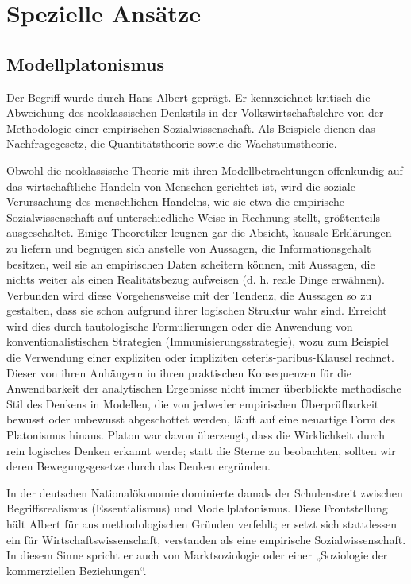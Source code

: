 \documentclass[a4paper, 12pt]{scrartcl}
\begin{document}
\section{Spezielle Ansätze}
\subsection{Modellplatonismus}
Der Begriff wurde durch Hans Albert geprägt. Er kennzeichnet kritisch die Abweichung des neoklassischen Denkstils in der Volkswirtschaftslehre von der Methodologie einer empirischen Sozialwissenschaft. Als Beispiele dienen das Nachfragegesetz, die Quantitätstheorie sowie die Wachstumstheorie.

Obwohl die neoklassische Theorie mit ihren Modellbetrachtungen offenkundig auf das wirtschaftliche Handeln von Menschen gerichtet ist, wird die soziale Verursachung des menschlichen Handelns, wie sie etwa die empirische Sozialwissenschaft auf unterschiedliche Weise in Rechnung stellt, größtenteils ausgeschaltet. Einige Theoretiker leugnen gar die Absicht, kausale Erklärungen zu liefern und begnügen sich anstelle von Aussagen, die Informationsgehalt besitzen, weil sie an empirischen Daten scheitern können, mit Aussagen, die nichts weiter als einen Realitätsbezug aufweisen (d. h. reale Dinge erwähnen). Verbunden wird diese Vorgehensweise mit der Tendenz, die Aussagen so zu gestalten, dass sie schon aufgrund ihrer logischen Struktur wahr sind. Erreicht wird dies durch tautologische Formulierungen oder die Anwendung von konventionalistischen Strategien (Immunisierungsstrategie), wozu zum Beispiel die Verwendung einer expliziten oder impliziten ceteris-paribus-Klausel rechnet. Dieser von ihren Anhängern in ihren praktischen Konsequenzen für die Anwendbarkeit der analytischen Ergebnisse nicht immer überblickte methodische Stil des Denkens in Modellen, die von jedweder empirischen Überprüfbarkeit bewusst oder unbewusst abgeschottet werden, läuft auf eine neuartige Form des Platonismus hinaus. Platon war davon überzeugt, dass die Wirklichkeit durch rein logisches Denken erkannt werde; statt die Sterne zu beobachten, sollten wir deren Bewegungsgesetze durch das Denken ergründen.

In der deutschen Nationalökonomie dominierte damals der Schulenstreit zwischen Begriffsrealismus (Essentialismus) und Modellplatonismus. Diese Frontstellung hält Albert für aus methodologischen Gründen verfehlt; er setzt sich stattdessen ein für Wirtschaftswissenschaft, verstanden als eine empirische Sozialwissenschaft. In diesem Sinne spricht er auch von Marktsoziologie oder einer „Soziologie der kommerziellen Beziehungen“.
\end{document}
